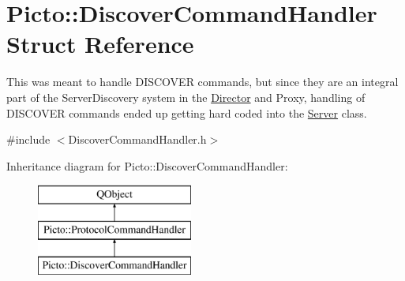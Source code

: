 \hypertarget{struct_picto_1_1_discover_command_handler}{\section{Picto\-:\-:Discover\-Command\-Handler Struct Reference}
\label{struct_picto_1_1_discover_command_handler}
}


This was meant to handle D\-I\-S\-C\-O\-V\-E\-R commands, but since they are an integral part of the Server\-Discovery system in the \hyperlink{class_director}{Director} and Proxy, handling of D\-I\-S\-C\-O\-V\-E\-R commands ended up getting hard coded into the \hyperlink{class_server}{Server} class.  




{\ttfamily \#include $<$Discover\-Command\-Handler.\-h$>$}

Inheritance diagram for Picto\-:\-:Discover\-Command\-Handler\-:\begin{figure}[H]
\begin{center}
\leavevmode
\includegraphics[height=3.000000cm]{struct_picto_1_1_discover_command_handler}
\end{center}
\end{figure}
